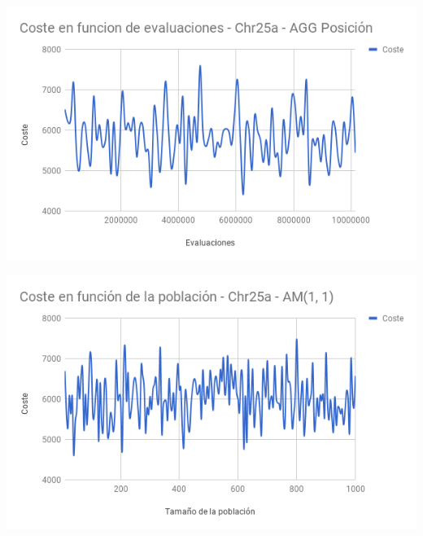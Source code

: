 \documentclass[a4paper, 12pt]{article}
\begin{document}
\begin{center}
         \includegraphics[scale=0.5]{coste-vs-evaluaciones}
      \end{center}
      
      \begin{center}
         \includegraphics[scale=0.5]{poblacion-vs-coste}
      \end{center}
   
\printindex
\end{document}

